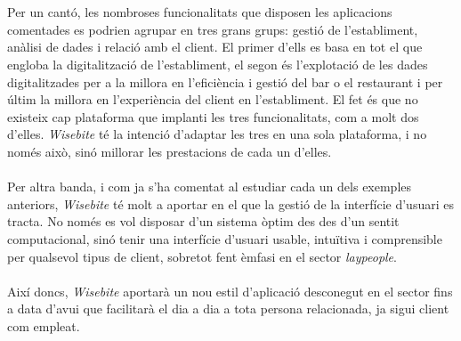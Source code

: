 \\\\
Per un cantó, les nombroses funcionalitats que disposen les aplicacions comentades es podrien agrupar en tres grans grups: gestió de l'establiment, anàlisi de dades i relació amb el client. El primer d'ells es basa en tot el que engloba la digitalització de l'establiment, el segon és l'explotació de les dades digitalitzades per a la millora en l'eficiència i gestió del bar o el restaurant i per últim la millora en l'experiència del client en l'establiment. El fet és que no existeix cap plataforma que implanti les tres funcionalitats, com a molt dos d'elles. \textit{Wisebite} té la intenció d'adaptar les tres en una sola plataforma, i no només això, sinó millorar les prestacions de cada un d'elles.
\\\\
Per altra banda, i com ja s'ha comentat al estudiar cada un dels exemples anteriors, \textit{Wisebite} té molt a aportar en el que la gestió de la interfície d'usuari es tracta. No només es vol disposar d'un sistema òptim des des d'un sentit computacional, sinó tenir una interfície d'usuari usable, intuïtiva i comprensible per qualsevol tipus de client, sobretot fent èmfasi en el sector \textit{laypeople}.
\\\\
Així doncs, \textit{Wisebite} aportarà un nou estil d'aplicació desconegut en el sector fins a data d'avui que facilitarà el dia a dia a tota persona relacionada, ja sigui client com empleat.